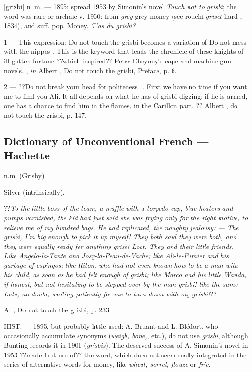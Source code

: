 [grizbi] n. m. --- 1895: spread 1953 by Simonin's novel \emph{Touch not to grisbi}; the word was rare or archaic v. 1950: from \emph{grey} \og grey money \fg{} (see rouchi \emph{griset} \og liard \fg{}, 1834), and suff. pop.
 Money. \emph{T'as du grisbi?}

1 --- This expression: \og Do not touch the grisbi \fg{} becomes a variation of \og Do not mess with the nippes \fg{}. This is the keyword that leads the chronicle of these knights of ill-gotten fortune ??which inspired??  Peter Cheyney's cape and machine gun novels.
, \emph{in} Albert , Do not touch the grisbi, Preface, p. 6.

2 --- ??\og Do not break your head for politeness \ldots{} First we have no time if you want me to find you Ali. It all depends on what he has of grisbi digging; if he is armed, one has a chance to find him in the flames, in the Carillon part. \fg{}??
Albert , do not touch the grisbi, p. 147.

\subsection*{Dictionary of Unconventional French --- Hachette}

n.m. (Grisby)

Silver (intrinsically).

??\emph{To the little boss of the team, a muffle with a torpedo cap, blue
heaters and pumps varnished, the kid had just said she was frying
only for the right motive, to relieve me of my hundred bags. He had
replicated, the naughty jealousy:
--- The \emph{grisbi}, I'm big enough to pick it up myself!
They both said they were both, and they were equally ready for anything
\emph{grisbi} Loot. They and their little friends. Like Angelo-la-Tante and
Josy-la-Peau-de-Vache; like Ali-le-Fumier and his garbage of espingos;
like Riton, who had not even known how to be a man with his child, as soon as he
had felt enough of \emph{grisbi}; like Marco and his little Wanda, if
honest, but not hesitating to be stepped over by the man \emph{grisbi}! like the same Lulu, no doubt, waiting patiently for me to turn down with my \emph{grisbi}!}??

A. , Do not touch the grisbi, p. 233

HIST. --- 1895, but probably little used: A. Bruant and L. Blédort, who
occasionally accumulate synonyms (\emph{weigh, bone,}, etc.), do not use \emph{grisbi}, although Bunting records it in 1901 (\emph{grisbis}). The deserved success of A. Simonin's novel in 1953 ??made first use of?? the word, which does not seem really integrated in the series of alternative words for money, like \emph{wheat, sorrel, flouze} or \emph{fric}.

